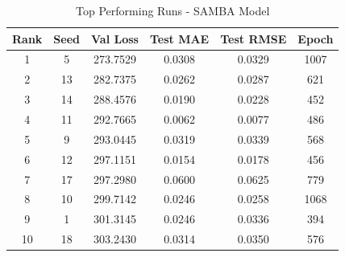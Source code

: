 \begin{table}[ht]
\centering
\caption{Top Performing Runs - SAMBA Model}
\label{tab:samba_results}
\begin{tabular}{cccccc}
\hline
\textbf{Rank} & \textbf{Seed} & \textbf{Val Loss} & \textbf{Test MAE} & \textbf{Test RMSE} & \textbf{Epoch} \\
\hline
1 & 5 & 273.7529 & 0.0308 & 0.0329 & 1007 \\
2 & 13 & 282.7375 & 0.0262 & 0.0287 & 621 \\
3 & 14 & 288.4576 & 0.0190 & 0.0228 & 452 \\
4 & 11 & 292.7665 & 0.0062 & 0.0077 & 486 \\
5 & 9 & 293.0445 & 0.0319 & 0.0339 & 568 \\
6 & 12 & 297.1151 & 0.0154 & 0.0178 & 456 \\
7 & 17 & 297.2980 & 0.0600 & 0.0625 & 779 \\
8 & 10 & 299.7142 & 0.0246 & 0.0258 & 1068 \\
9 & 1 & 301.3145 & 0.0246 & 0.0336 & 394 \\
10 & 18 & 303.2430 & 0.0314 & 0.0350 & 576 \\
\hline
\end{tabular}
\end{table}
